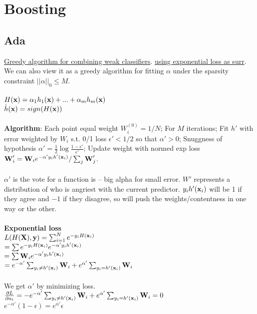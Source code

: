 \section{Boosting}
\subsection{Ada}
\underline{Greedy algorithm for combining weak classifiers}.
\underline{using exponential loss as surr}.\\
We can also view it as a greedy algorithm for fitting $\alpha$ under the sparsity constraint $||\alpha||_0 \leq M$.\\\\
$H({\textrm{\textbf{x}}}) = \alpha_1 h_1 ({\textrm{\textbf{x}}}) + ... + \alpha_m h_m({\textrm{\textbf{x}}})$\\ $\hat{h}({\textrm{\textbf{x}}}) = sign(H({\textrm{\textbf{x}}}))$\\\\
\textbf{Algorithm}: Each point equal weight $W_{i}^{(0)} = 1/N$; %
For $M$ iterations;
Fit $h'$ with error weighted by $W_i$ s.t. 0/1 loss $\epsilon' < 1/2$ so that $\alpha' > 0$; %
Snuggness of hypothesis $\alpha' = \frac{1}{2}\log \frac{1-\epsilon'}{\epsilon'}$; %
Update weight with normed exp loss ${\textrm{\textbf{W}}}_{i}' = {\textrm{\textbf{W}}}_{i} e^{-\alpha'y_ih'({\textrm{\textbf{x}}}_i)}/\sum_{j}{\textrm{\textbf{W}}}_j'$.\\\\
$\alpha'$ is the vote for a function is -- big alpha for small error. $W'$ represents a distribution of who is angriest with the current predictor. $y_ih'({\textrm{\textbf{x}}}_i)$ will be 1 if they agree and $-1$ if they disagree, so will push the weights/contentness in one way or the other.\\\\
\textbf{Exponential loss}\\
$L(H({\textrm{\textbf{X}}}), {\textrm{\textbf{y}}}) = \sum_{i=1}^{N}e^{-y_iH({\textrm{\textbf{x}}}_i)}$\\
$= \sum e^{-y_iH({\textrm{\textbf{x}}}_i)} e^{-\alpha' y_i h'({\textrm{\textbf{x}}}_i)}$\\
$= \sum {\textrm{\textbf{W}}}_{i}e^{-\alpha' y_i h'({\textrm{\textbf{x}}}_i)}$\\
$= e^{-\alpha'}\sum_{y_i \neq h'({\textrm{\textbf{x}}}_i)} {\textrm{\textbf{W}}}_i + e^{\alpha'}\sum_{y_i = h'({\textrm{\textbf{x}}}_i)} {\textrm{\textbf{W}}}_i$\\\\
We get $\alpha'$ by minimizing loss.\\
$\frac{\partial L}{\partial a_t} = -e^{-\alpha'}\sum_{y_i \neq h'({\textrm{\textbf{x}}}_i)} {\textrm{\textbf{W}}}_i + e^{\alpha'}\sum_{y_i = h'({\textrm{\textbf{x}}}_i)} {\textrm{\textbf{W}}}_i = 0$\\
$e^{-\alpha'}(1-\epsilon) = e^{\alpha'}\epsilon$\\
